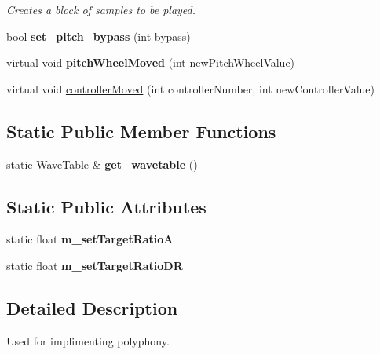 \begin{DoxyCompactItemize}
\begin{DoxyCompactList}\small\item\em Creates a block of samples to be played. \end{DoxyCompactList}\item 
bool {\bfseries set\+\_\+pitch\+\_\+bypass} (int bypass)\hypertarget{class_poly_voice_a4b208c88cbc1ab64dd8abecdc426b00b}{}\label{class_poly_voice_a4b208c88cbc1ab64dd8abecdc426b00b}

\item 
virtual void {\bfseries pitch\+Wheel\+Moved} (int new\+Pitch\+Wheel\+Value)\hypertarget{class_poly_voice_a67d94dd26fb335fda78e478b5f73b605}{}\label{class_poly_voice_a67d94dd26fb335fda78e478b5f73b605}

\item 
virtual void \hyperlink{class_poly_voice_acbeb017fc5d66d6a2cb73802c37be4bb}{controller\+Moved} (int controller\+Number, int new\+Controller\+Value)
\end{DoxyCompactItemize}
\subsection*{Static Public Member Functions}
\begin{DoxyCompactItemize}
\item 
static \hyperlink{class_wave_table}{Wave\+Table} \& {\bfseries get\+\_\+wavetable} ()\hypertarget{class_poly_voice_a325ad7c776c459c7b61e568a7c97d09b}{}\label{class_poly_voice_a325ad7c776c459c7b61e568a7c97d09b}

\end{DoxyCompactItemize}
\subsection*{Static Public Attributes}
\begin{DoxyCompactItemize}
\item 
static float {\bfseries m\+\_\+set\+Target\+RatioA}\hypertarget{class_poly_voice_a500ab64a8f85b97f304f1f8dc19148d6}{}\label{class_poly_voice_a500ab64a8f85b97f304f1f8dc19148d6}

\item 
static float {\bfseries m\+\_\+set\+Target\+Ratio\+DR}\hypertarget{class_poly_voice_aa324531526b0900f2bec46e94a3ad932}{}\label{class_poly_voice_aa324531526b0900f2bec46e94a3ad932}

\end{DoxyCompactItemize}


\subsection{Detailed Description}
Used for implimenting polyphony. 

